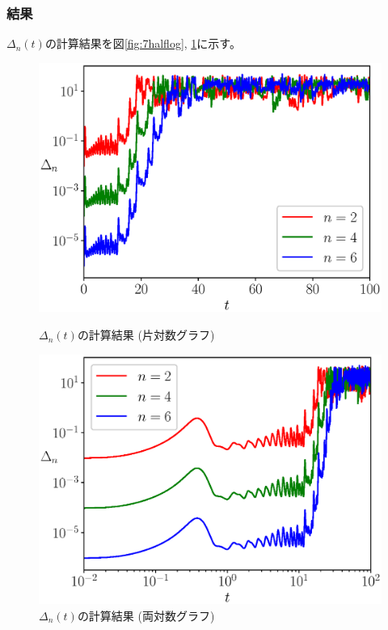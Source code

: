 \documentclass[a4j, titlepage]{jsarticle}
\numberwithin{equation}{section}
\begin{document}
        \subsubsection{結果}
            $\Delta_n(t)$の計算結果を図\ref{fig:7halflog}, \ref{fig:7fulllog}に示す。
            \begin{figure}[h]
                \begin{minipage}{0.49\hsize}
                    \centering
                    \includegraphics[width=1\hsize]{kadai7/2halflog.eps}
                    \caption{
                        $\Delta_n(t)$の計算結果
                        (片対数グラフ)
                    }
                    \label{fig:7halflog}
                \end{minipage}
                \begin{minipage}{0.49\hsize}
                    \centering
                    \includegraphics[width=1\hsize]{kadai7/2fulllog.eps}
                    \caption{
                        $\Delta_n(t)$の計算結果
                        (両対数グラフ)
                    }
                    \label{fig:7fulllog}
                \end{minipage}
            \end{figure}
\end{document}
